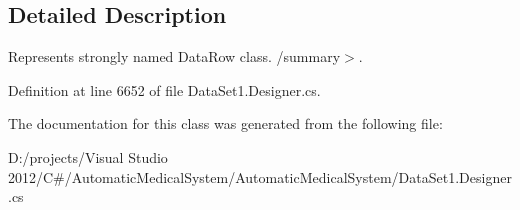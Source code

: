 \subsection{Detailed Description}
Represents strongly named DataRow class. /summary$>$. 

Definition at line 6652 of file DataSet1.Designer.cs.

The documentation for this class was generated from the following file:\begin{CompactItemize}
\item 
D:/projects/Visual Studio 2012/C\#/AutomaticMedicalSystem/AutomaticMedicalSystem/DataSet1.Designer.cs\end{CompactItemize}
